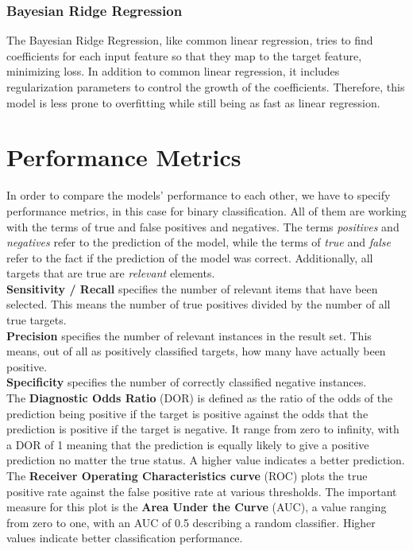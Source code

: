 \documentclass[conference,compsoc]{IEEEtran}
\begin{document}
\subsubsection{Bayesian Ridge Regression}
The Bayesian Ridge Regression, like common linear regression, tries to find coefficients for each input feature so that they map to the target feature, minimizing loss.
In addition to common linear regression, it includes regularization parameters to control the growth of the coefficients.
Therefore, this model is less prone to overfitting while still being as fast as linear regression.


\section{Performance Metrics}
In order to compare the models' performance to each other, we have to specify performance metrics, in this case for binary classification.
All of them are working with the terms of true and false positives and negatives.
The terms \emph{positives} and \emph{negatives} refer to the prediction of the model, while the terms of \emph{true} and \emph{false} refer to the fact if the prediction of the model was correct.
Additionally, all targets that are true are \emph{relevant} elements. \\
\textbf{Sensitivity / Recall} specifies the number of relevant items that have been selected.
This means the number of true positives divided by the number of all true targets. \\
\textbf{Precision} specifies the number of relevant instances in the result set.
This means, out of all as positively classified targets, how many have actually been positive. \\
\textbf{Specificity} specifies the number of correctly classified negative instances. \\
The \textbf{Diagnostic Odds Ratio} (DOR) is defined as the ratio of the odds of the prediction being positive if the target is positive against the odds that the prediction is positive if the target is negative.
It range from zero to infinity, with a DOR of 1 meaning that the prediction is equally likely to give a positive prediction no matter the true status.
A higher value indicates a better prediction. \\
The \textbf{Receiver Operating Characteristics curve} (ROC) plots the true positive rate against the false positive rate at various thresholds.
The important measure for this plot is the \textbf{Area Under the Curve} (AUC), a value ranging from zero to one, with an AUC of 0.5 describing a random classifier.
Higher values indicate better classification performance.
\end{document}
